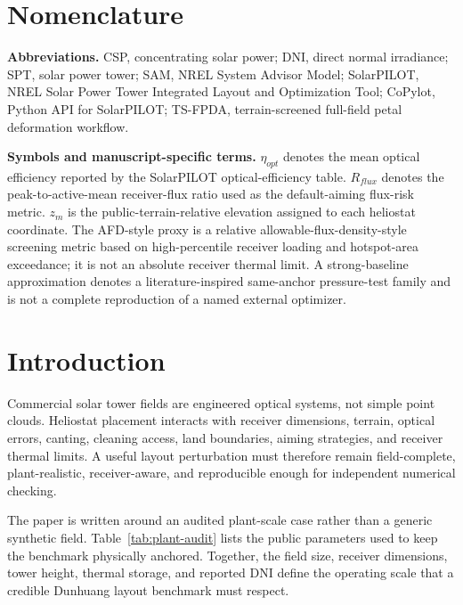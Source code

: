 \documentclass[final,3p,times]{elsarticle}
\begin{document}
\section{Nomenclature}
\noindent\textbf{Abbreviations.}
CSP, concentrating solar power; DNI, direct normal irradiance; SPT, solar power tower; SAM, NREL System Advisor Model; SolarPILOT, NREL Solar Power Tower Integrated Layout and Optimization Tool; CoPylot, Python API for SolarPILOT; TS-FPDA, terrain-screened full-field petal deformation workflow.

\noindent\textbf{Symbols and manuscript-specific terms.}
$\eta_{opt}$ denotes the mean optical efficiency reported by the SolarPILOT optical-efficiency table. $R_{flux}$ denotes the peak-to-active-mean receiver-flux ratio used as the default-aiming flux-risk metric. $z_m$ is the public-terrain-relative elevation assigned to each heliostat coordinate. The AFD-style proxy is a relative allowable-flux-density-style screening metric based on high-percentile receiver loading and hotspot-area exceedance; it is not an absolute receiver thermal limit. A strong-baseline approximation denotes a literature-inspired same-anchor pressure-test family and is not a complete reproduction of a named external optimizer.

\section{Introduction}
Commercial solar tower fields are engineered optical systems, not simple point clouds. Heliostat placement interacts with receiver dimensions, terrain, optical errors, canting, cleaning access, land boundaries, aiming strategies, and receiver thermal limits. A useful layout perturbation must therefore remain field-complete, plant-realistic, receiver-aware, and reproducible enough for independent numerical checking.

The paper is written around an audited plant-scale case rather than a generic synthetic field. Table~\ref{tab:plant-audit} lists the public parameters used to keep the benchmark physically anchored. Together, the field size, receiver dimensions, tower height, thermal storage, and reported DNI define the operating scale that a credible Dunhuang layout benchmark must respect.
\end{document}
